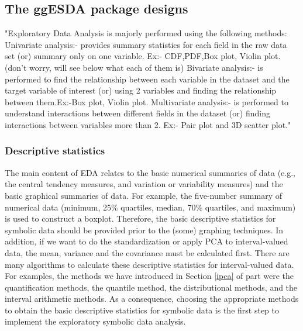 \documentclass[article]{jss}
\begin{document}
\subsection{The ggESDA package designs}
"Exploratory Data Analysis is majorly performed using the following methods:
Univariate analysis:- provides summary statistics for each field in the raw data set (or) summary only on one variable. Ex:- CDF,PDF,Box plot, Violin plot.(don't worry, will see below what each of them is)
Bivariate analysis:- is performed to find the relationship between each variable in the dataset and the target variable of interest (or) using 2 variables and finding the relationship between them.Ex:-Box plot, Violin plot.
Multivariate analysis:- is performed to understand interactions between different fields in the dataset (or) finding interactions between variables more than 2. Ex:- Pair plot and 3D scatter plot."




\subsubsection{Descriptive statistics}
The main content of EDA relates to the basic numerical summaries of
data (e.g., the central tendency measures, and variation or
variability measures) and the basic graphical summaries of data. For
example, the five-number summary of numerical data (minimum, 25\%
quartiles, median, 70\% quartiles, and maximum) is used to construct a
boxplot. Therefore, the basic descriptive statistics for symbolic data
should be provided prior to the (some) graphing techniques. In
addition, if we want to do the standardization or apply PCA to
interval-valued data, the mean, variance and the covariance must be
calculated first. There are many algorithms to calculate these
descriptive statistics for interval-valued data. For examples, the
methods we have introduced in Section \ref{ipca} of part were the
quantification methods, the quantile method, the distributional
methods, and the interval arithmetic methods. As a consequence,
choosing the appropriate methods to obtain the basic descriptive
statistics for symbolic data is the first step to implement the
exploratory symbolic data analysis.
\end{document}
